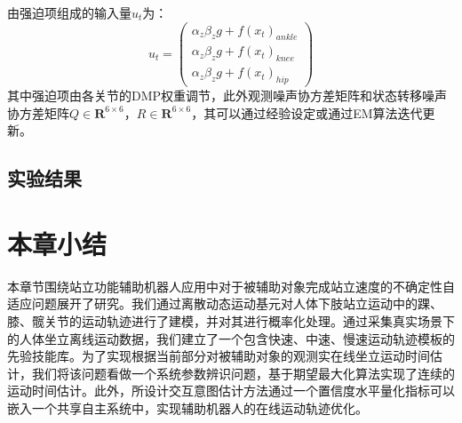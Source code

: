 由强迫项组成的输入量$u_t$为：
\begin{equation}
    u_t=\left(\begin{array}{l}
        \alpha_z \beta_z g+ f\left(x_t\right)_{ankle}\\
        \alpha_z \beta_z g+ f\left(x_t\right)_{knee}\\
        \alpha_z \beta_z g+ f\left(x_t\right)_{hip}
    \end{array}\right)
\end{equation}
其中强迫项由各关节的DMP权重调节，此外观测噪声协方差矩阵和状态转移噪声协方差矩阵$Q\in \mathbf{R}^{6 \times 6}$，$R\in \mathbf{R}^{6 \times 6}$，其可以通过经验设定或通过EM算法迭代更新\cite{bishopPatternRecognitionMachine2006}。

\subsection{实验结果} 

\section{本章小结}
本章节围绕站立功能辅助机器人应用中对于被辅助对象完成站立速度的不确定性自适应问题展开了研究。我们通过离散动态运动基元对人体下肢站立运动中的踝、膝、髋关节的运动轨迹进行了建模，并对其进行概率化处理。通过采集真实场景下的人体坐立离线运动数据，我们建立了一个包含快速、中速、慢速运动轨迹模板的先验技能库。为了实现根据当前部分对被辅助对象的观测实在线坐立运动时间估计，我们将该问题看做一个系统参数辨识问题，基于期望最大化算法实现了连续的运动时间估计。此外，所设计交互意图估计方法通过一个置信度水平量化指标可以嵌入一个共享自主系统中，实现辅助机器人的在线运动轨迹优化。
